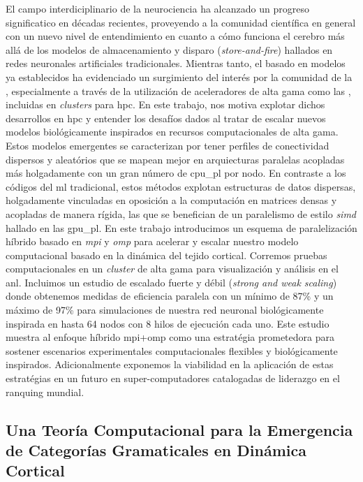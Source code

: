 El campo interdiciplinario de la neurociencia ha alcanzado un progreso significatico en décadas recientes, proveyendo a la comunidad científica en general con un nuevo nivel de entendimiento en cuanto a cómo funciona el cerebro más allá de los modelos de almacenamiento y disparo (\emph{store-and-fire}) hallados en redes neuronales artificiales tradicionales.
Mientras tanto, el  basado en modelos ya establecidos ha evidenciado un surgimiento del interés por la comunidad de la , especialmente a través de la utilización de aceleradores de alta gama como las , incluidas en \emph{clusters} para \gls{hpc}. 
En este trabajo, nos motiva explotar dichos desarrollos en \gls{hpc} y entender los desafíos dados al tratar de escalar nuevos modelos biológicamente inspirados en recursos computacionales de alta gama.
Estos modelos emergentes se caracterizan por tener perfiles de conectividad dispersos y aleatórios que se mapean mejor en arquiecturas paralelas acopladas más holgadamente con un gran número de \gls{cpu_pl} por nodo.
En contraste a los códigos del \gls{ml} tradicional, estos métodos explotan estructuras de datos dispersas, holgadamente vinculadas en oposición a la computación en matrices densas y acopladas de manera rígida, las que se benefician de un paralelismo de estilo \emph{\gls{simd}} hallado en las \gls{gpu_pl}.
En este trabajo introducimos un esquema de paralelización híbrido basado en \emph{\gls{mpi}} y \emph{\gls{omp}} para acelerar y escalar nuestro modelo computacional basado en la dinámica del tejido cortical.
Corremos pruebas computacionales en un \emph{cluster} de alta gama para visualización y análisis en el \gls{anl}.
Incluimos un estudio de escalado fuerte y débil (\emph{strong and weak scaling}) donde obtenemos medidas de eficiencia paralela con un mínimo de 87\% y un máximo de 97\% para simulaciones de nuestra red neuronal biológicamente inspirada en hasta 64 nodos con 8 hilos de ejecución cada uno.
Este estudio muestra al enfoque híbrido \gls{mpi}+\gls{omp} como una estratégia prometedora para sostener escenarios experimentales computacionales flexibles y biológicamente inspirados.
Adicionalmente exponemos la viabilidad en la aplicación de estas estratégias en un futuro en super-computadores catalogadas de liderazgo en el ranquing mundial.





\subsection{Una Teoría Computacional para la Emergencia de Categorías Gramaticales en Dinámica Cortical}

